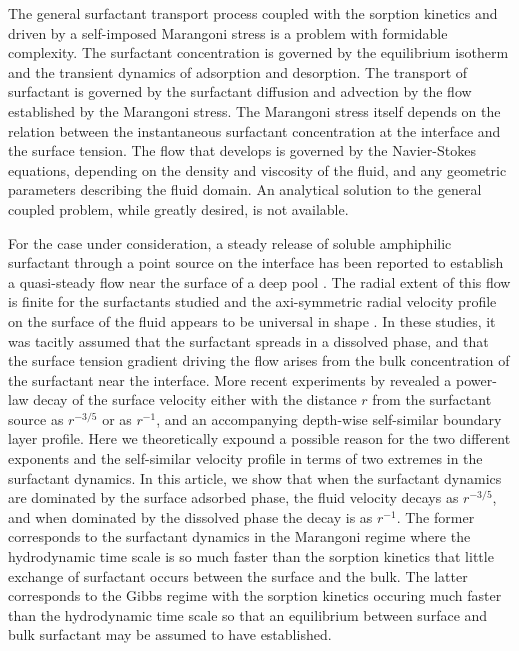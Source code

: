 \documentclass[]{jfm}
\begin{document}
The general surfactant transport process coupled with the sorption kinetics and driven by a self-imposed Marangoni stress \citep*{Dukhin1995,Noskov1996,Eastoe2000,Young2009,Xu2013} is a problem with formidable complexity.
The surfactant concentration is governed by the equilibrium isotherm and the transient dynamics of adsorption and desorption.
The transport of surfactant is governed by the surfactant diffusion and advection by the flow established by the Marangoni stress.
The Marangoni stress itself depends on the relation between the instantaneous surfactant concentration at the interface and the surface tension. 
The flow that develops is governed by the Navier-Stokes equations, depending on the density and viscosity of the fluid, and any geometric parameters describing the fluid domain.
An analytical solution to the general coupled problem, while greatly desired, is not available.

For the case under consideration, a steady release of soluble amphiphilic surfactant through a point source on the interface has been reported to establish a quasi-steady flow near the surface of a deep pool \citep{Roche2014,LeRoux2016}.
The radial extent of this flow is finite for the surfactants studied \citep{LeRoux2016} and the axi-symmetric radial velocity profile on the surface of the fluid appears to be universal in shape \citep{Roche2014}.
In these studies, it was tacitly assumed that the surfactant spreads in a dissolved phase, and that the surface tension gradient driving the flow arises from the bulk concentration of the surfactant near the interface.
More recent experiments by \cite*{Mandre2017a} revealed a power-law decay of the surface velocity either with the distance $r$ from the surfactant source as $r^{-3/5}$ or as $r^{-1}$, and an accompanying depth-wise self-similar boundary layer profile.
Here we theoretically expound a possible reason for the two different exponents and the self-similar velocity profile in terms of two extremes in the surfactant dynamics.
In this article, we show that when the surfactant dynamics are dominated by the surface adsorbed phase, the fluid velocity decays as $r^{-3/5}$, and when dominated by the dissolved phase the decay is as $r^{-1}$.
The former corresponds to the surfactant dynamics in the Marangoni regime where the hydrodynamic time scale is so much faster than the sorption kinetics that little exchange of surfactant occurs between the surface and the bulk. 
The latter corresponds to the Gibbs regime with the sorption kinetics occuring much faster than the hydrodynamic time scale so that an equilibrium between surface and bulk surfactant may be assumed to have established.
\end{document}
